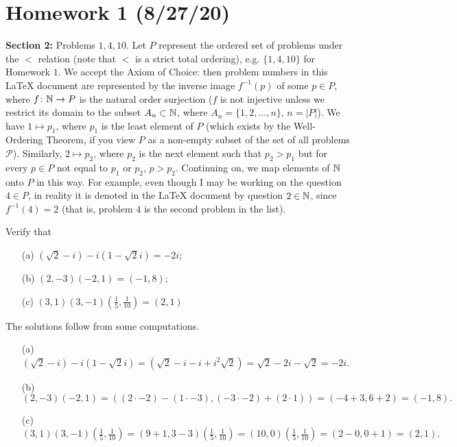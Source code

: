 \section*{Homework 1 (8/27/20)}
\textbf{Section 2:} Problems $1, 4, 10$. Let $P$ represent the ordered set of problems under the $<$ relation (note that $<$ is a strict total ordering), e.g. $\{ 1,4,10 \}$ for Homework $1$. We accept the Axiom of Choice: then problem numbers in this \LaTeX{} document are represented by the inverse image $f^{-1}(p)$ of some $p \in P$, where $f \colon \mathbb{N} \to P$ is the natural order surjection ($f$ is not injective unless we restrict its domain to the subset $A_n \subset \mathbb{N}$, where $A_n = \{1,2, ... , n\}$, $n=|P|$). We have $1 \mapsto p_1$, where $p_1$ is the least element of $P$ (which exists by the Well-Ordering Theorem, if you view $P$ as a non-empty subset of the set of all problems $\mathscr{P}$). Similarly, $2 \mapsto p_2$, where $p_2$ is the next element such that $p_2 > p_1$ but for every $p \in P$ not equal to $p_1$ or $p_2$, $p > p_2.$ Continuing on, we map elements of $\mathbb{N}$ onto $P$ in this way. For example, even though I may be working on the question $4 \in P$, in reality it is denoted in the \LaTeX{} document by question $2 \in \mathbb{N}$, since $f^{-1}(4)=2$ (that is, problem $4$ is the second problem in the list).

\begin{problem}[Question 1]
    Verify that
    \begin{enumerate}
        \item[(a)] $(\sqrt{2} - i) - i(1-\sqrt{2} i)=-2i;$ 
        \item[(b)] $(2,-3)(-2, 1) = (-1,8);$ 
        \item[(c)] $(3,1)(3,-1)\left( \frac{1}{5},\frac{1}{10} \right) =(2,1)$
    \end{enumerate}
\end{problem}
\begin{solution}
    The solutions follow from some computations.
    \begin{enumerate}
        \item[(a)] $(\sqrt{2} -i)-i(1-\sqrt{2} i)  = (\sqrt{2} -i-i+i^2\sqrt{2} ) = \sqrt{2} -2i-\sqrt{2} = -2i$.
        \item[(b)] $(2,-3)(-2,1)=(\left( 2\cdot-2 \right)  - \left( 1\cdot -3 \right) , \left( -3\cdot -2 \right)  + \left( 2\cdot1 \right) ) = (-4+3, 6+2)=(-1,8).$
        \item[(c)] $(3,1)(3,-1)\left( \frac{1}{5},\frac{1}{10} \right) = (9+1,3-3)\left( \frac{1}{5},\frac{1}{10} \right) = (10,0)\left( \frac{1}{5},\frac{1}{10} \right) = (2-0, 0+1)=(2,1). $
    \end{enumerate}
\end{solution}
    
